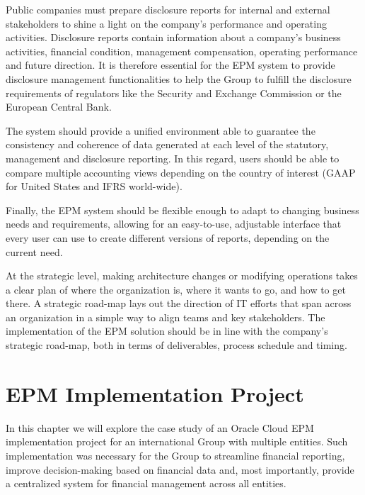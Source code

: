 \documentclass[12pt,a4paper,openright,twoside]{book}
\begin{document}
Public companies must prepare disclosure reports for internal and external stakeholders to shine a light on the company's performance and operating activities.
%
Disclosure reports contain information about a company's business activities, financial condition, management compensation, operating performance and future direction. 
%
It is therefore essential for the EPM system to provide disclosure management functionalities to help the Group to fulfill the disclosure requirements of regulators like the Security and Exchange Commission or the European Central Bank.

The system should provide  a unified environment able to guarantee the consistency and coherence of data generated at each level of the statutory, management and disclosure reporting.
%
In this regard, users should be able to compare multiple accounting views depending on the country of interest (GAAP for United States and IFRS world-wide).

Finally, the EPM system should be flexible enough to adapt to changing business needs and requirements, allowing for an easy-to-use, adjustable interface that every user can use to create different versions of reports, depending on the current need.

At the strategic level, making architecture changes or modifying operations takes a clear plan of where the organization is, where it wants to go, and how to get there. 
%
A strategic road-map lays out the direction of IT efforts that span across an organization in a simple way to align teams and key stakeholders.
%
The implementation of the EPM solution should be in line with the company's strategic road-map, both in terms of deliverables, process schedule and timing.

\chapter{EPM Implementation Project}
\label{chap:implementation}

In this chapter we will explore the case study of an Oracle Cloud EPM implementation project for an international Group with multiple entities.
%
Such implementation was necessary for the Group to streamline financial reporting, improve decision-making based on financial data and, most importantly, provide a centralized system for financial management across all entities.
\end{document}
